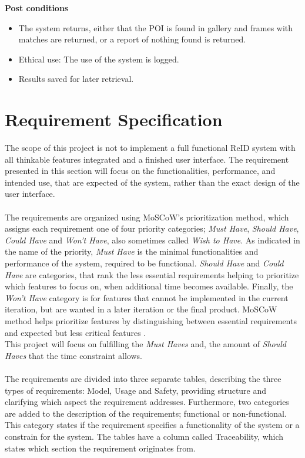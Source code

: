 \noindent\textbf{Post conditions} 
\begin{itemize}
    \item The system returns, either that the \ac{POI} is found in gallery and frames with matches are returned, or a report of nothing found is returned.
    \item Ethical use: The use of the system is logged.
    \item Results saved for later retrieval.
\end{itemize}

\section{Requirement Specification} \label{sec:reqspec}
The scope of this project is not to implement a full functional \acs{ReID} system with all thinkable features integrated and a finished user interface. The requirement presented in this section will focus on the functionalities, performance, and intended use, that are expected of the system, rather than the exact design of the user interface.
\\\\
The requirements are organized using MoSCoW's prioritization method, which assigns each requirement one of four priority categories; \textit{Must Have}, \textit{Should Have}, \textit{Could Have} and \textit{Won't Have}, also sometimes called \textit{Wish to Have}. As indicated in the name of the priority, \textit{Must Have} is the minimal functionalities and performance of the system, required to be functional. \textit{Should Have} and \textit{Could Have} are categories, that rank the less essential requirements helping to prioritize which features to focus on, when additional time becomes available. Finally, the \textit{Won't Have} category is for features that cannot be implemented in the current iteration, but are wanted in a later iteration or the final product. MoSCoW method helps prioritize features by distinguishing between essential requirements and expected but less critical features \cite{Moscow}. 
\\
This project will focus on fulfilling the \textit{Must Haves} and, the amount of \textit{Should Haves} that the time constraint allows.
\\\\
The requirements are divided into three separate tables, describing the three types of requirements: Model, Usage and Safety, providing structure and clarifying which aspect the requirement addresses. Furthermore, two categories are added to the description of the requirements; functional or non-functional. This category states if the requirement specifies a functionality of the system or a constrain for the system. The tables have a column called Traceability, which states which section the requirement originates from.
